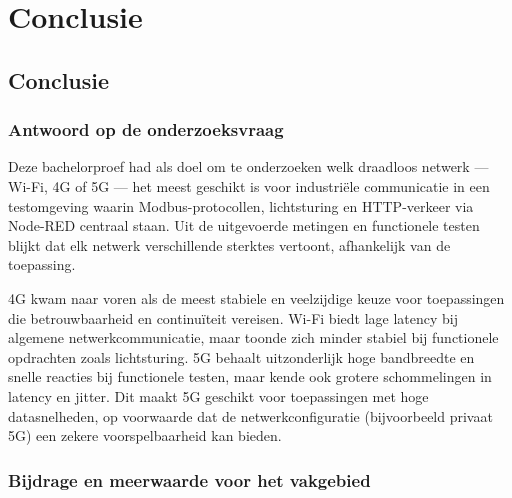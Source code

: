 
\chapter{Conclusie}%
\label{ch:conclusie}



\section{Conclusie}

\subsection{Antwoord op de onderzoeksvraag}

Deze bachelorproef had als doel om te onderzoeken welk draadloos netwerk — Wi-Fi, 4G of 5G — het meest geschikt is voor industriële communicatie in een testomgeving waarin Modbus-protocollen, lichtsturing en HTTP-verkeer via Node-RED centraal staan. Uit de uitgevoerde metingen en functionele testen blijkt dat elk netwerk verschillende sterktes vertoont, afhankelijk van de toepassing.

4G kwam naar voren als de meest stabiele en veelzijdige keuze voor toepassingen die betrouwbaarheid en continuïteit vereisen. Wi-Fi biedt lage latency bij algemene netwerkcommunicatie, maar toonde zich minder stabiel bij functionele opdrachten zoals lichtsturing. 5G behaalt uitzonderlijk hoge bandbreedte en snelle reacties bij functionele testen, maar kende ook grotere schommelingen in latency en jitter. Dit maakt 5G geschikt voor toepassingen met hoge datasnelheden, op voorwaarde dat de netwerkconfiguratie (bijvoorbeeld privaat 5G) een zekere voorspelbaarheid kan bieden.

\subsection{Bijdrage en meerwaarde voor het vakgebied}


